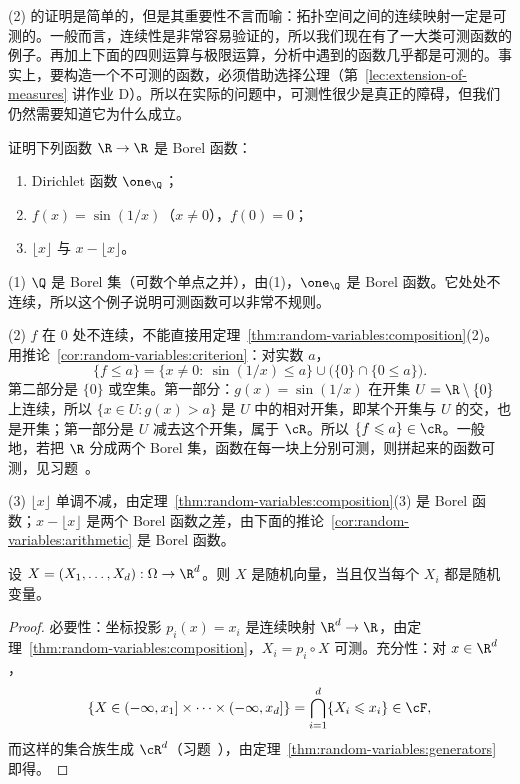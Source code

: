 \begin{remark}
(2) 的证明是简单的，但是其重要性不言而喻：拓扑空间之间的连续映射一定是可测的。一般而言，连续性是非常容易验证的，所以我们现在有了一大类可测函数的例子。再加上下面的四则运算与极限运算，分析中遇到的函数几乎都是可测的。事实上，要构造一个不可测的函数，必须借助选择公理（第~\ref{lec:extension-of-measures} 讲作业 D）。所以在实际的问题中，可测性很少是真正的障碍，但我们仍然需要知道它为什么成立。
\end{remark}

\begin{workedexample}\label{we:random-variables:borel-functions}
证明下列函数 $\R\to\R$ 是 Borel 函数：
\begin{enumerate}
\item Dirichlet 函数 $\one_\Q$；
\item $f(x)=\sin(1/x)$（$x\neq0$），$f(0)=0$；
\item $\lfloor x\rfloor$ 与 $x-\lfloor x\rfloor$。
\end{enumerate}
\end{workedexample}
\begin{solution}
(1) $\Q$ 是 Borel 集（可数个单点之并），由(1)，$\one_\Q$ 是 Borel 函数。它处处不连续，所以这个例子说明可测函数可以非常不规则。

(2) $f$ 在 $0$ 处不连续，不能直接用定理~\ref{thm:random-variables:composition}(2)。用推论~\ref{cor:random-variables:criterion}：对实数 $a$，
\[
\{f\leqslant a\}=\{x\neq0:\ \sin(1/x)\leqslant a\}\cup\bigl(\{0\}\cap\{0\leqslant a\}\bigr).
\]
第二部分是 $\{0\}$ 或空集。第一部分：$g(x)=\sin(1/x)$ 在开集 $U=\R\setminus\{0\}$ 上连续，所以 $\{x\in U:g(x)>a\}$ 是 $U$ 中的相对开集，即某个开集与 $U$ 的交，也是开集；第一部分是 $U$ 减去这个开集，属于 $\cR$。所以 $\{f\leqslant a\}\in\cR$。一般地，若把 $\R$ 分成两个 Borel 集，函数在每一块上分别可测，则拼起来的函数可测，见习题~。

(3) $\lfloor x\rfloor$ 单调不减，由定理~\ref{thm:random-variables:composition}(3) 是 Borel 函数；$x-\lfloor x\rfloor$ 是两个 Borel 函数之差，由下面的推论~\ref{cor:random-variables:arithmetic} 是 Borel 函数。
\end{solution}

\begin{theorem}[随机向量与分量]\label{thm:random-variables:vector}
设 $X=(X_1,\dots,X_d):\Omega\to\R^d$。则 $X$ 是随机向量，当且仅当每个 $X_i$ 都是随机变量。
\end{theorem}
\begin{proof}
必要性：坐标投影 $p_i(x)=x_i$ 是连续映射 $\R^d\to\R$，由定理~\ref{thm:random-variables:composition}，$X_i=p_i\circ X$ 可测。充分性：对 $x\in\R^d$，
\[
\{X\in(-\infty,x_1]\times\cdots\times(-\infty,x_d]\}=\bigcap_{i=1}^d\{X_i\leqslant x_i\}\in\cF,
\]
而这样的集合族生成 $\cR^d$（习题~），由定理~\ref{thm:random-variables:generators} 即得。
\end{proof}

